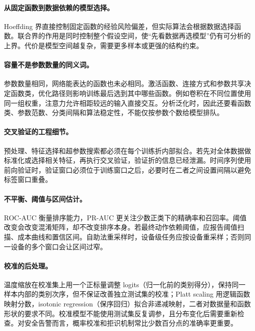 \paragraph{从固定函数到数据依赖的模型选择。}
Hoeffding 界直接控制固定函数的经验风险偏差，但实际算法会根据数据选择函数。联合界的作用是同时控制整个假设空间，使“先看数据再选模型”仍有可分析的上界。代价是模型空间越复杂，需要更多样本或更强的结构约束。

\paragraph{容量不是参数数量的同义词。}
参数数量相同，网络能表达的函数也未必相同。激活函数、连接方式和参数共享决定函数类，优化路径则影响训练最后选到其中哪些函数。例如卷积在不同位置使用同一组权重，注意力允许相距较远的输入直接交互。分析泛化时，因此还要看函数类、参数范数、分类间隔和算法稳定性，不能仅按参数个数给模型排队。

\paragraph{交叉验证的工程细节。}
预处理、特征选择和超参数搜索都必须在每个训练折内部拟合。若先对全体数据做标准化或选择相关特征，再执行交叉验证，验证折的信息已经泄漏。时间序列使用前向验证时，验证窗口必须位于训练窗口之后，必要时在二者之间设置间隔以避免标签窗口重叠。

\paragraph{不平衡、阈值与区间估计。}
ROC-AUC 衡量排序能力，PR-AUC 更关注少数正类下的精确率和召回率。阈值改变会改变混淆矩阵，却不改变排序本身。若最终动作依赖阈值，应报告阈值扫描、成本曲线和置信区间。自助法重采样时，设备级任务应按设备重采样；否则同一设备的多个窗口会让区间过窄。

\paragraph{校准的后处理。}
温度缩放在校准集上用一个正标量调整 logits（归一化前的类别得分），保持同一样本内部的类别次序，但不保证改善独立测试集的校准；Platt scaling 用逻辑函数映射分数，isotonic regression（保序回归）拟合非递减映射，二者对数据量和函数形状的要求不同。校准模型不能使用测试集反复调参，且分布变化后需要重新检查。对安全告警而言，概率校准和拒识机制常比少数百分点的准确率更重要。

